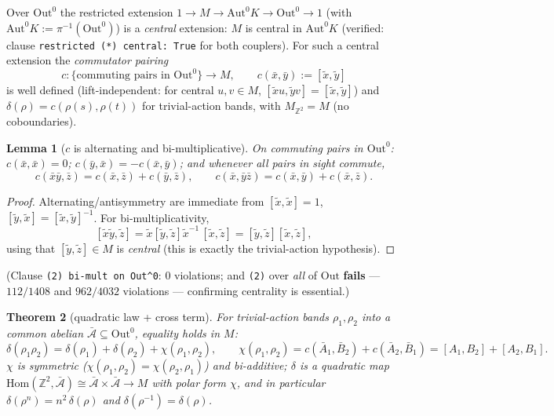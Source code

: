 \documentclass[11pt]{article}
\newtheorem{theorem}{Theorem}
\newtheorem{lemma}[theorem]{Lemma}
\theoremstyle{definition}
\newcommand{\Z}{\mathbb{Z}}
\newcommand{\Aut}{\mathrm{Aut}}
\newcommand{\Out}{\mathrm{Out}}
\newcommand{\Hom}{\mathrm{Hom}}
\newcommand{\Ab}{\bar{\mathcal{A}}}
\begin{document}
Over $\Out^0$ the restricted extension
$1\to M\to\Aut^0K\to\Out^0\to1$ (with $\Aut^0K:=\pi^{-1}(\Out^0)$) is a \emph{central}
extension: $M$ is central in $\Aut^0K$ (verified: clause
\texttt{restricted (*) central: True} for both couplers). For such a central extension
the \emph{commutator pairing}
\[
c\colon\{\text{commuting pairs in }\Out^0\}\to M,\qquad c(\bar x,\bar y):=[\tilde x,\tilde y]
\]
is well defined (lift-independent: for central $u,v\in M$,
$[\tilde xu,\tilde yv]=[\tilde x,\tilde y]$) and $\delta(\rho)=c(\rho(s),\rho(t))$ for
trivial-action bands, with $M_{\Z^2}=M$ (no coboundaries).

\begin{lemma}[$c$ is alternating and bi-multiplicative]\label{lem:c}
On commuting pairs in $\Out^0$: $c(\bar x,\bar x)=0$; $c(\bar y,\bar x)=-c(\bar x,\bar y)$;
and whenever all pairs in sight commute,
\[
c(\bar x\bar y,\bar z)=c(\bar x,\bar z)+c(\bar y,\bar z),\qquad
c(\bar x,\bar y\bar z)=c(\bar x,\bar y)+c(\bar x,\bar z).
\]
\end{lemma}

\begin{proof}
Alternating/antisymmetry are immediate from $[\tilde x,\tilde x]=1$,
$[\tilde y,\tilde x]=[\tilde x,\tilde y]^{-1}$. For bi-multiplicativity,
\[
[\tilde x\tilde y,\tilde z]=\tilde x[\tilde y,\tilde z]\tilde x^{-1}\,[\tilde x,\tilde z]
=[\tilde y,\tilde z][\tilde x,\tilde z],
\]
using that $[\tilde y,\tilde z]\in M$ is \emph{central} (this is exactly the
trivial-action hypothesis).
\end{proof}

\noindent (Clause \texttt{(2) bi-mult on Out\^{}0}: $0$ violations; and \texttt{(2)}
over \emph{all} of $\Out$ \textbf{fails} --- $112/1408$ and $962/4032$ violations ---
confirming centrality is essential.)

\begin{theorem}[quadratic law + cross term]\label{thm:quadratic}
For trivial-action bands $\rho_1,\rho_2$ into a common abelian $\Ab\subseteq\Out^0$,
equality holds in $M$:
\[
\delta(\rho_1\rho_2)=\delta(\rho_1)+\delta(\rho_2)+\chi(\rho_1,\rho_2),\qquad
\chi(\rho_1,\rho_2)=c(\bar A_1,\bar B_2)+c(\bar A_2,\bar B_1)=[A_1,B_2]+[A_2,B_1].
\]
$\chi$ is symmetric ($\chi(\rho_1,\rho_2)=\chi(\rho_2,\rho_1)$) and bi-additive;
$\delta$ is a \emph{quadratic map}
$\Hom(\Z^2,\Ab)\cong\Ab\times\Ab\to M$ with polar form $\chi$, and in particular
$\delta(\rho^n)=n^2\,\delta(\rho)$ and $\delta(\rho^{-1})=\delta(\rho)$.
\end{theorem}
\end{document}

